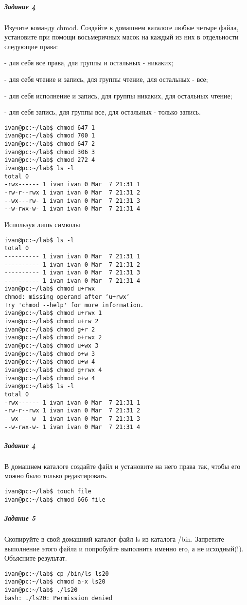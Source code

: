 \subparagraph{Задание 4}
Изучите команду chmod. Создайте в домашнем каталоге любые четыре файла,
установите при помощи восьмеричных масок на каждый из них в отдельности
следующие права:

- для себя все права, для группы и остальных - никаких;

- для себя чтение и запись, для группы чтение, для остальных - все;

- для себя исполнение и запись, для группы никаких, для остальных чтение;

- для себя запись, для группы все, для остальных - только запись.
\begin{verbatim}
ivan@pc:~/lab$ chmod 647 1
ivan@pc:~/lab$ chmod 700 1
ivan@pc:~/lab$ chmod 647 2
ivan@pc:~/lab$ chmod 306 3
ivan@pc:~/lab$ chmod 272 4
ivan@pc:~/lab$ ls -l
total 0
-rwx------ 1 ivan ivan 0 Mar  7 21:31 1
-rw-r--rwx 1 ivan ivan 0 Mar  7 21:31 2
--wx---rw- 1 ivan ivan 0 Mar  7 21:31 3
--w-rwx-w- 1 ivan ivan 0 Mar  7 21:31 4
\end{verbatim}

Используя лишь символы
\begin{verbatim}
ivan@pc:~/lab$ ls -l
total 0
---------- 1 ivan ivan 0 Mar  7 21:31 1
---------- 1 ivan ivan 0 Mar  7 21:31 2
---------- 1 ivan ivan 0 Mar  7 21:31 3
---------- 1 ivan ivan 0 Mar  7 21:31 4
ivan@pc:~/lab$ chmod u+rwx
chmod: missing operand after ‘u+rwx’
Try 'chmod --help' for more information.
ivan@pc:~/lab$ chmod u+rwx 1
ivan@pc:~/lab$ chmod u+rw 2
ivan@pc:~/lab$ chmod g+r 2
ivan@pc:~/lab$ chmod o+rwx 2
ivan@pc:~/lab$ chmod u+wx 3
ivan@pc:~/lab$ chmod o+w 3
ivan@pc:~/lab$ chmod u+w 4
ivan@pc:~/lab$ chmod g+rwx 4
ivan@pc:~/lab$ chmod o+w 4
ivan@pc:~/lab$ ls -l
total 0
-rwx------ 1 ivan ivan 0 Mar  7 21:31 1
-rw-r--rwx 1 ivan ivan 0 Mar  7 21:31 2
--wx----w- 1 ivan ivan 0 Mar  7 21:31 3
--w-rwx-w- 1 ivan ivan 0 Mar  7 21:31 4    
\end{verbatim}

\subparagraph{Задание 4}

В домашнем каталоге создайте файл и установите на него права так, чтобы его
можно было только редактировать.

\begin{verbatim}
ivan@pc:~/lab$ touch file
ivan@pc:~/lab$ chmod 666 file
\end{verbatim}

\subparagraph{Задание 5}
Скопируйте в свой домашний каталог файл ls из каталога /bin. Запретите
выполнение этого файла и попробуйте выполнить именно его, а не исходный(!).
Объясните результат.
\begin{verbatim}
ivan@pc:~/lab$ cp /bin/ls ls20
ivan@pc:~/lab$ chmod a-x ls20
ivan@pc:~/lab$ ./ls20
bash: ./ls20: Permission denied
\end{verbatim}